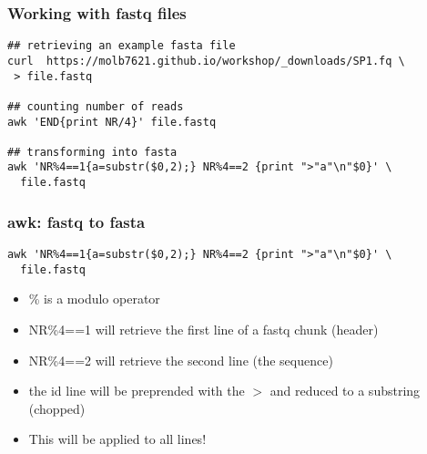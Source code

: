 \documentclass{beamer}
\begin{document}
\begin{frame}[fragile]
  \frametitle{Working with fastq files}
\begin{small}
\begin{verbatim}
## retrieving an example fasta file
curl  https://molb7621.github.io/workshop/_downloads/SP1.fq \
 > file.fastq

## counting number of reads
awk 'END{print NR/4}' file.fastq

## transforming into fasta
awk 'NR%4==1{a=substr($0,2);} NR%4==2 {print ">"a"\n"$0}' \
  file.fastq

\end{verbatim}
\end{small}
\end{frame}


\begin{frame}[fragile]
  \frametitle{awk: fastq to fasta}
\begin{small}
\begin{verbatim}
awk 'NR%4==1{a=substr($0,2);} NR%4==2 {print ">"a"\n"$0}' \
  file.fastq
\end{verbatim}
\end{small}
  \begin{itemize}
  \item \% is a modulo operator
  \item NR\%4==1 will retrieve the first line of a fastq chunk (header)
  \item NR\%4==2 will retrieve the second line (the sequence)
  \item the id line will be preprended with the $>$ and reduced to a substring (chopped)
  \item This will be applied to all lines!

  \end{itemize}
\end{frame}

\end{document}
